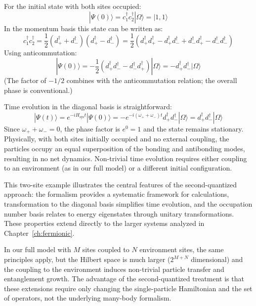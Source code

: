 \documentclass[12pt,oneside,openright]{report}
\theoremstyle{definition}
\theoremstyle{plain}
\theoremstyle{remark}
\begin{document}
For the initial state with both sites occupied:
\begin{equation}
|\Psi(0)\rangle = c_1^\dagger c_2^\dagger |\Omega\rangle = |1,1\rangle
\end{equation}
In the momentum basis this state can be written as:
\begin{equation}
c_1^\dagger c_2^\dagger = \frac{1}{2}(d_+^\dagger + d_-^\dagger)(d_+^\dagger - d_-^\dagger) 
= \frac{1}{2}(d_+^\dagger d_+^\dagger - d_+^\dagger d_-^\dagger + d_-^\dagger d_+^\dagger - d_-^\dagger d_-^\dagger)
\end{equation}
Using anticommutation:
\begin{equation}
|\Psi(0)\rangle = -\frac{1}{2}(d_+^\dagger d_-^\dagger - d_-^\dagger d_+^\dagger)|\Omega\rangle 
= -d_+^\dagger d_-^\dagger |\Omega\rangle
\end{equation}
(The factor of $-1/2$ combines with the anticommutation relation; the overall phase is conventional.)

Time evolution in the diagonal basis is straightforward:
\begin{equation}
|\Psi(t)\rangle = e^{-iH_{\mathrm{sys}}t} |\Psi(0)\rangle 
= -e^{-i(\omega_+ + \omega_-)t} d_+^\dagger d_-^\dagger |\Omega\rangle 
= d_+^\dagger d_-^\dagger |\Omega\rangle
\end{equation}
Since $\omega_+ + \omega_- = 0$, the phase factor is $e^{0} = 1$ and the state remains stationary.
Physically, with both sites initially occupied and no external coupling, the particles occupy 
an equal superposition of the bonding and antibonding modes, resulting in no net dynamics. 
Non-trivial time evolution requires either coupling to an environment (as in our full model) 
or a different initial configuration.

This two-site example illustrates the central features of the second-quantized approach: 
the formalism provides a systematic framework for calculations, transformation to the diagonal 
basis simplifies time evolution, and the occupation number basis relates to energy eigenstates 
through unitary transformations. These properties extend directly to the larger systems 
analyzed in Chapter~\ref{ch:fermionic}.

In our full model with $M$ sites coupled to $N$ environment sites, the same principles apply, 
but the Hilbert space is much larger ($2^{M+N}$ dimensional) and the coupling to the environment 
induces non-trivial particle transfer and entanglement growth. The advantage of the second-quantized treatment is that these extensions require only changing the single-particle Hamiltonian and the set of operators, not the underlying many-body formalism.
\end{document}
